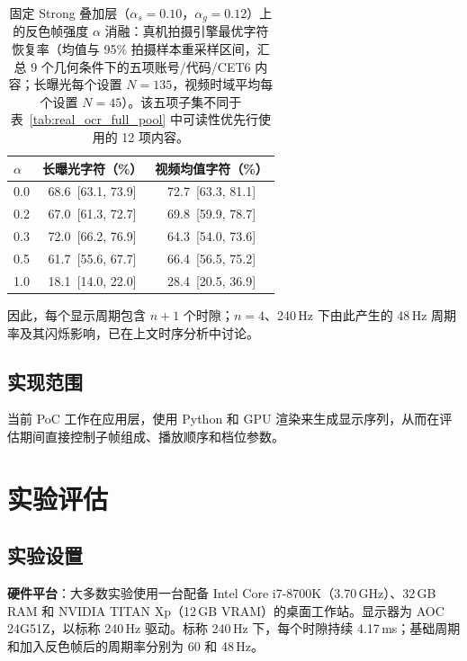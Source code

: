 \documentclass{ieeeaccess}
\begin{document}
\begin{table}[!t]
\caption{固定 Strong 叠加层（$\alpha_s=0.10$，$\alpha_g=0.12$）上的反色帧强度 $\alpha$ 消融：真机拍摄引擎最优字符恢复率（均值与 95\% 拍摄样本重采样区间，汇总 9 个几何条件下的五项账号/代码/CET6 内容；长曝光每个设置 $N=135$，视频时域平均每个设置 $N=45$）。该五项子集不同于表~\ref{tab:real_ocr_full_pool} 中可读性优先行使用的 12 项内容。}
\label{tab:inversion_ablation}
\centering
\footnotesize
\begin{tabular}{lcc}
\toprule
$\alpha$ & 长曝光字符（\%） & 视频均值字符（\%） \\
\midrule
0.0 & 68.6~[63.1, 73.9] & 72.7~[63.3, 81.1] \\
0.2 & 67.0~[61.3, 72.7] & 69.8~[59.9, 78.7] \\
0.3 & 72.0~[66.2, 76.9] & 64.3~[54.0, 73.6] \\
0.5 & 61.7~[55.6, 67.7] & 66.4~[56.5, 75.2] \\
1.0 & 18.1~[14.0, 22.0] & 28.4~[20.5, 36.9] \\
\bottomrule
\end{tabular}
\end{table}

因此，每个显示周期包含 $n+1$ 个时隙；$n=4$、240\,Hz 下由此产生的 48\,Hz 周期率及其闪烁影响，已在上文时序分析中讨论。

\subsection{实现范围}

当前 PoC 工作在应用层，使用 Python 和 GPU 渲染来生成显示序列，从而在评估期间直接控制子帧组成、播放顺序和档位参数。


\section{实验评估}
\label{sec:evaluation}

\subsection{实验设置}
\label{sec:setup}

\textbf{硬件平台}：大多数实验使用一台配备 Intel Core i7-8700K（3.70\,GHz）、32\,GB RAM 和 NVIDIA TITAN Xp（12\,GB VRAM）的桌面工作站。显示器为 AOC 24G51Z，以标称 240\,Hz 驱动。标称 240\,Hz 下，每个时隙持续 4.17\,ms；基础周期和加入反色帧后的周期率分别为 60 和 48\,Hz。
\end{document}
